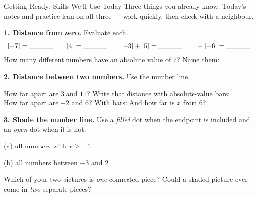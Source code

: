 \documentclass[12pt]{article}
\newcommand{\numline}[2]{%
  \draw[->, semithick, charcoal] (#1-0.5,0)--(#2+0.5,0);
  \foreach \x in {#1,...,#2}{\draw[charcoal] (\x,0.12)--(\x,-0.12) node[below, font=\scriptsize]{$\x$};}}
\begin{document}

\vspace{0.10in}

\begin{notesbox}{Getting Ready: Skills We'll Use Today}
Three things you already know. Today's notes and practice lean on all three --- work quickly,
then check with a neighbour.

\vspace{6pt}
\textbf{1. Distance from zero.} Evaluate each.
\[
  |{-7}| = \blank{1.2cm} \qquad |4| = \blank{1.2cm} \qquad
  |{-3}| + |5| = \blank{1.2cm} \qquad -|{-6}| = \blank{1.2cm}
\]
How many different numbers have an absolute value of $7$? \blank{1.6cm} \; Name them:
\blank{2.4cm}

\vspace{8pt}
\textbf{2. Distance between two numbers.} Use the number line.
\begin{center}
\end{center}
\vspace{-4pt}
How far apart are $3$ and $11$? \blank{1.4cm} \; Write that distance with absolute-value bars:
\blank{2.4cm} \\[6pt]
How far apart are $-2$ and $6$? \blank{1.4cm} \; With bars: \blank{2.4cm} \; And how far is
$x$ from $6$? \blank{2.4cm}

\vspace{8pt}
\textbf{3. Shade the number line.} Use a \emph{filled} dot when the endpoint is included and an
\emph{open} dot when it is not.

\vspace{2pt}
\begin{minipage}[t]{0.48\linewidth}
\centering (a) all numbers with $x \ge -1$ \\[4pt]
\end{minipage}\hfill
\begin{minipage}[t]{0.48\linewidth}
\centering (b) all numbers between $-3$ and $2$ \\[4pt]
\end{minipage}

\vspace{6pt}
Which of your two pictures is \emph{one} connected piece? \blank{2.0cm} \; Could a shaded picture
ever come in \emph{two} separate pieces? \blank{1.6cm}
\end{notesbox}
\end{document}
